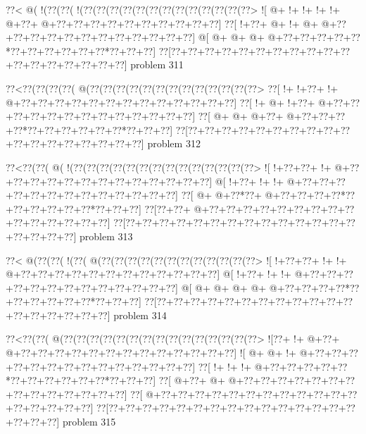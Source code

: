 \vbox{\vbox{\goo
\0??<\- @(\- !(\0??(\0??(\- !(\0??(\0??(\0??(\0??(\0??(\0??(\0??(\0??(\0??(\0??(\0??(\0??(\0??>
\- ![\- @+\- !+\- !+\- !+\- !+\- @+\0??+\- @+\0??+\0??+\0??+\0??+\0??+\0??+\0??+\0??+\0??+\0??]
\0??[\- !+\0??+\- @+\- !+\- @+\- @+\0??+\0??+\0??+\0??+\0??+\0??+\0??+\0??+\0??+\0??+\0??+\0??]
\- @[\- @+\- @+\- @+\- @+\0??+\0??+\0??+\0??+\0??*\0??+\0??+\0??+\0??+\0??+\0??*\0??+\0??+\0??]
\0??[\0??+\0??+\0??+\0??+\0??+\0??+\0??+\0??+\0??+\0??+\0??+\0??+\0??+\0??+\0??+\0??+\0??+\0??]
}
\hfil problem 311\hfil\break
}



\vbox{\vbox{\goo
\0??<\0??(\0??(\0??(\0??(\- @(\0??(\0??(\0??(\0??(\0??(\0??(\0??(\0??(\0??(\0??(\0??(\0??(\0??>
\0??[\- !+\- !+\0??+\- !+\- @+\0??+\0??+\0??+\0??+\0??+\0??+\0??+\0??+\0??+\0??+\0??+\0??+\0??]
\0??[\- !+\- @+\- !+\0??+\- @+\0??+\0??+\0??+\0??+\0??+\0??+\0??+\0??+\0??+\0??+\0??+\0??+\0??]
\0??[\- @+\- @+\- @+\0??+\- @+\0??+\0??+\0??+\0??*\0??+\0??+\0??+\0??+\0??+\0??*\0??+\0??+\0??]
\0??[\0??+\0??+\0??+\0??+\0??+\0??+\0??+\0??+\0??+\0??+\0??+\0??+\0??+\0??+\0??+\0??+\0??+\0??]
}
\hfil problem 312\hfil\break
}



\vbox{\vbox{\goo
\0??<\0??(\0??(\- @(\- !(\0??(\0??(\0??(\0??(\0??(\0??(\0??(\0??(\0??(\0??(\0??(\0??(\0??(\0??>
\- ![\- !+\0??+\0??+\- !+\- @+\0??+\0??+\0??+\0??+\0??+\0??+\0??+\0??+\0??+\0??+\0??+\0??+\0??]
\- @[\- !+\0??+\- !+\- !+\- @+\0??+\0??+\0??+\0??+\0??+\0??+\0??+\0??+\0??+\0??+\0??+\0??+\0??]
\0??[\- @+\- @+\0??*\0??+\- @+\0??+\0??+\0??+\0??*\0??+\0??+\0??+\0??+\0??+\0??*\0??+\0??+\0??]
\0??[\0??+\0??+\- @+\0??+\0??+\0??+\0??+\0??+\0??+\0??+\0??+\0??+\0??+\0??+\0??+\0??+\0??+\0??]
\0??[\0??+\0??+\0??+\0??+\0??+\0??+\0??+\0??+\0??+\0??+\0??+\0??+\0??+\0??+\0??+\0??+\0??+\0??]
}
\hfil problem 313\hfil\break
}



\vbox{\vbox{\goo
\0??<\- @(\0??(\0??(\- !(\0??(\- @(\0??(\0??(\0??(\0??(\0??(\0??(\0??(\0??(\0??(\0??(\0??(\0??>
\- ![\- !+\0??+\0??+\- !+\- !+\- @+\0??+\0??+\0??+\0??+\0??+\0??+\0??+\0??+\0??+\0??+\0??+\0??]
\- @[\- !+\0??+\- !+\- !+\- @+\0??+\0??+\0??+\0??+\0??+\0??+\0??+\0??+\0??+\0??+\0??+\0??+\0??]
\- @[\- @+\- @+\- @+\- @+\- @+\0??+\0??+\0??+\0??*\0??+\0??+\0??+\0??+\0??+\0??*\0??+\0??+\0??]
\0??[\0??+\0??+\0??+\0??+\0??+\0??+\0??+\0??+\0??+\0??+\0??+\0??+\0??+\0??+\0??+\0??+\0??+\0??]
}
\hfil problem 314\hfil\break
}



\vbox{\vbox{\goo
\0??<\0??(\0??(\- @(\0??(\0??(\0??(\0??(\0??(\0??(\0??(\0??(\0??(\0??(\0??(\0??(\0??(\0??(\0??>
\- ![\0??+\- !+\- @+\0??+\- @+\0??+\0??+\0??+\0??+\0??+\0??+\0??+\0??+\0??+\0??+\0??+\0??+\0??]
\- ![\- @+\- @+\- !+\- @+\0??+\0??+\0??+\0??+\0??+\0??+\0??+\0??+\0??+\0??+\0??+\0??+\0??+\0??]
\0??[\- !+\- !+\- !+\- @+\0??+\0??+\0??+\0??+\0??*\0??+\0??+\0??+\0??+\0??+\0??*\0??+\0??+\0??]
\0??[\- @+\0??+\- @+\- @+\0??+\0??+\0??+\0??+\0??+\0??+\0??+\0??+\0??+\0??+\0??+\0??+\0??+\0??]
\0??[\- @+\0??+\0??+\0??+\0??+\0??+\0??+\0??+\0??+\0??+\0??+\0??+\0??+\0??+\0??+\0??+\0??+\0??]
\0??[\0??+\0??+\0??+\0??+\0??+\0??+\0??+\0??+\0??+\0??+\0??+\0??+\0??+\0??+\0??+\0??+\0??+\0??]
}
\hfil problem 315\hfil\break
}



